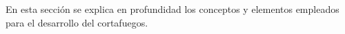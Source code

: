 En esta sección se explica en profundidad los conceptos y elementos empleados para el desarrollo del cortafuegos.